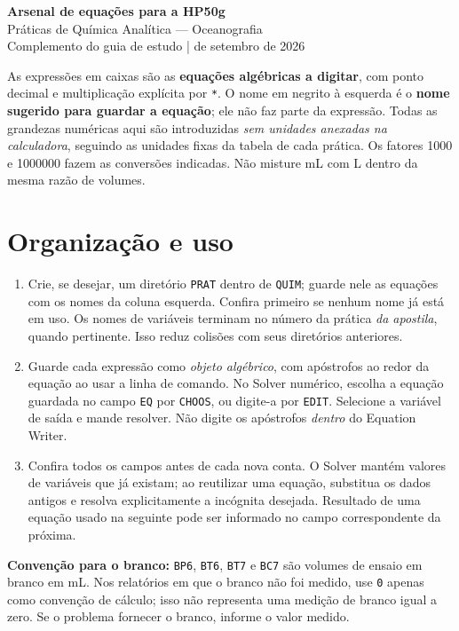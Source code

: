 \documentclass[11pt,a4paper]{article}
\newcommand{\dica}[1]{\par\medskip\noindent\colorbox{claro}{\parbox{\dimexpr\linewidth-2\fboxsep\relax}{\strut #1\strut}}\par\medskip}
\begin{document}
\begin{center}
{\Large\bfseries\color{azul} Arsenal de equações para a HP50g}\\[4pt]
{\large Práticas de Química Analítica --- Oceanografia}\\[4pt]
\small Complemento do guia de estudo \quad |  de setembro de 2026
\end{center}

\noindent As expressões em caixas são as \textbf{equações algébricas a digitar}, com ponto decimal e multiplicação explícita por \texttt{*}. O nome em negrito à esquerda é o \textbf{nome sugerido para guardar a equação}; ele não faz parte da expressão. Todas as grandezas numéricas aqui são introduzidas \emph{sem unidades anexadas na calculadora}, seguindo as unidades fixas da tabela de cada prática. Os fatores 1000 e 1000000 fazem as conversões indicadas. Não misture mL com L dentro da mesma razão de volumes.

\section*{Organização e uso}
\begin{enumerate}
\item Crie, se desejar, um diretório \texttt{PRAT} dentro de \texttt{QUIM}; guarde nele as equações com os nomes da coluna esquerda. Confira primeiro se nenhum nome já está em uso. Os nomes de variáveis terminam no número da prática \emph{da apostila}, quando pertinente. Isso reduz colisões com seus diretórios anteriores.
\item Guarde cada expressão como \emph{objeto algébrico}, com apóstrofos ao redor da equação ao usar a linha de comando. No Solver numérico, escolha a equação guardada no campo \texttt{EQ} por \texttt{CHOOS}, ou digite-a por \texttt{EDIT}. Selecione a variável de saída e mande resolver. Não digite os apóstrofos \emph{dentro} do Equation Writer.
\item Confira todos os campos antes de cada nova conta. O Solver mantém valores de variáveis que já existam; ao reutilizar uma equação, substitua os dados antigos e resolva explicitamente a incógnita desejada. Resultado de uma equação usado na seguinte pode ser informado no campo correspondente da próxima.
\end{enumerate}
\dica{\textbf{Convenção para o branco:} \texttt{BP6}, \texttt{BT6}, \texttt{BT7} e \texttt{BC7} são volumes de ensaio em branco em mL. Nos relatórios em que o branco não foi medido, use \texttt{0} apenas como convenção de cálculo; isso não representa uma medição de branco igual a zero. Se o problema fornecer o branco, informe o valor medido.}
\end{document}

